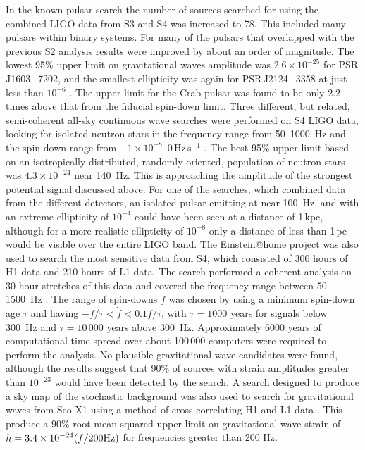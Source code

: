 \documentclass{article}
\begin{document}
In the known pulsar search the number of sources searched for using the combined
LIGO data from S3 and S4 was increased to 78. This included many pulsars within
binary systems. For many of the pulsars that overlapped with the previous S2
analysis results were improved by about an order of magnitude. The lowest 95\%
upper limit on gravitational waves amplitude was $2.6\times10^{-25}$ for
PSR\,J1603$-$7202, and the smallest ellipticity was again for PSR\,J2124$-$3358
at just less than $10^{-6}$ \cite{Abbott:2007d}. The upper limit for the Crab
pulsar was found to be only 2.2 times above that from the fiducial spin-down
limit. Three different, but related, semi-coherent all-sky continuous
wave searches were performed on S4 LIGO data, looking for isolated neutron stars
in the frequency range from 50--1000~Hz and the spin-down range from
$-1\times10^{-8}$--0\,Hz\,s$^{-1}$ \cite{Abbott:2008e}. The best 95\% upper
limit based on an isotropically distributed, randomly oriented, population of
neutron stars was $4.3\times10^{-24}$ near 140~Hz. This is approaching the
amplitude of the strongest potential signal discussed above. For one of the
searches, which combined data from the different detectors, an isolated pulsar
emitting at near 100~Hz, and with an extreme ellipticity of $10^{-4}$ could
have been seen at a distance of 1\,kpc, although for a more realistic
ellipticity of $10^{-8}$ only a distance of less than 1\,pc would be visible
over the entire LIGO band. The Einstein@home project \cite{eath} was also used
to search the most sensitive data from S4, which consisted of 300 hours of H1
data and 210 hours of L1 data. The search performed a coherent analysis on 30
hour stretches of this data and covered the frequency range between
50--1500~Hz \cite{Abbott:2008f}. The range of spin-downs $\dot{f}$ was chosen
by using a minimum spin-down age $\tau$ and having $-f/\tau < \dot{f} <
0.1f/\tau$, with $\tau = 1000$ years for signals below 300~Hz and $\tau = 
10\,000$ years above 300~Hz. Approximately 6000 years of computational time
spread over about 100\,000 computers were required to perform the analysis. No
plausible gravitational wave candidates were found, although the results suggest
that 90\% of sources with strain amplitudes greater than $10^{-23}$ would have
been detected by the search. A search designed to produce a sky map of the
stochastic background was also used to search for gravitational waves from
Sco-X1 using a method of cross-correlating H1 and L1 data \cite{Abbott:2007f}.
This produce a 90\% root mean squared upper limit on gravitational wave strain
of $h = 3.4\times10^{-24}(f/200 {\rm Hz})$ for frequencies greater than 200 Hz.
\end{document}
